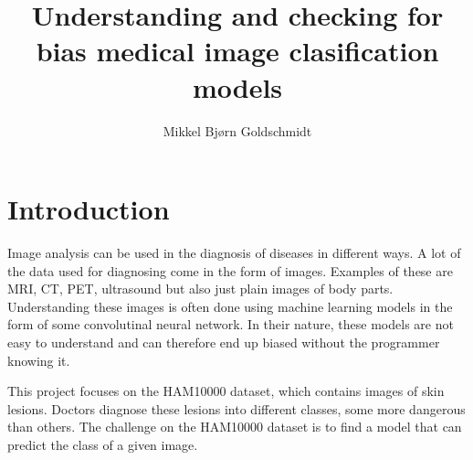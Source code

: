 \documentclass[11pt,a4paper]{article}
\title{Understanding and checking for bias medical image clasification models}
\author{Mikkel Bjørn Goldschmidt}
\begin{document}
\maketitle

\section{Introduction}
Image analysis can be used in the diagnosis of diseases in different ways.
A lot of the data used for diagnosing come in the form of images.
Examples of these are MRI, CT, PET, ultrasound but also just plain images of body parts.
Understanding these images is often done using machine learning models in the form of
some convolutinal neural network.
In their nature, these models are not easy to understand and can therefore end up biased without
the programmer knowing it.

This project focuses on the HAM10000 dataset, which contains images of skin lesions.
Doctors diagnose these lesions into different classes, some more dangerous than others.
The challenge on the HAM10000 dataset is to find a model that can predict the class of a given image.
\end{document}
